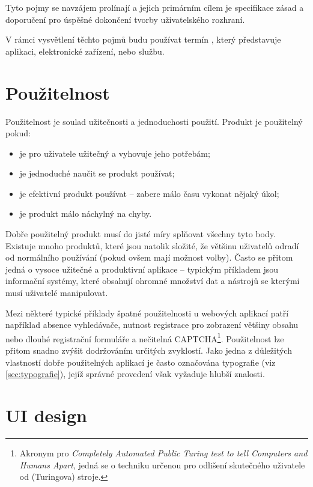Tyto pojmy se navzájem prolínají a jejich primárním cílem je specifikace zásad a doporučení pro úspěšné dokončení tvorby uživatelského rozhraní.

V rámci vysvětlení těchto pojmů budu používat termín , který představuje aplikaci, elektronické zařízení, nebo službu.

\section{Použitelnost}
\label{sec:usability}

Použitelnost je soulad užitečnosti a jednoduchosti použití. Produkt je použitelný pokud:

\begin{itemize}
    \item je pro uživatele užitečný a vyhovuje jeho potřebám;
    \item je jednoduché naučit se produkt používat;
    \item je efektivní produkt používat -- zabere málo času vykonat nějaký úkol;
    \item je produkt málo náchylný na chyby.
\end{itemize}

Dobře použitelný produkt musí do jisté míry splňovat všechny tyto body. Existuje mnoho produktů, které jsou natolik složité, že většinu uživatelů odradí od normálního používání (pokud ovšem mají možnost volby). Často se přitom jedná o vysoce užitečné a produktivní aplikace -- typickým příkladem jsou informační systémy, které obsahují ohromné množství dat a nástrojů se kterými musí uživatelé manipulovat.

Mezi některé typické příklady špatné použitelnosti u webových aplikací patří například absence vyhledávače, nutnost registrace pro zobrazení většiny obsahu nebo dlouhé registrační formuláře a nečitelná CAPTCHA\footnote{Akronym pro \textit{Completely Automated Public Turing test to tell Computers and Humans Apart}, jedná se o techniku určenou pro odlišení skutečného uživatele od (Turingova) stroje.}. Použitelnost lze přitom snadno zvýšit dodržováním určitých zvyklostí. Jako jedna z důležitých vlastností dobře použitelných aplikací je často označována typografie (viz \ref{sec:typografie}), jejíž správné provedení však vyžaduje hlubší znalosti.

\section{UI design}
\label{sec:uidesign}

